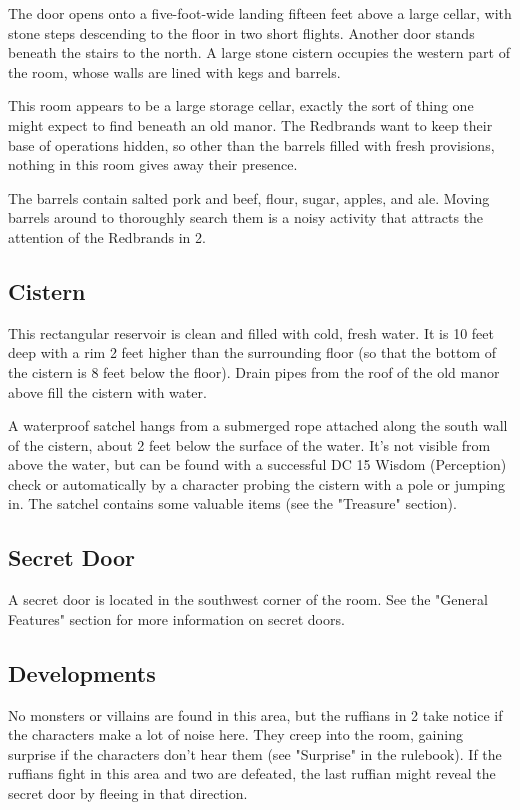 \documentclass[10pt,a4paper,twoside,bg=print,twocolumn,openany,nodeprecatedcode]{dndbook}
\begin{document}
\begin{DndReadAloud}{}
The door opens onto a five-foot-wide landing fifteen feet above a large cellar, with stone steps descending to the floor in two short flights. Another door stands beneath the stairs to the north. A large stone cistern occupies the western part of the room, whose walls are lined with kegs and barrels.

\end{DndReadAloud}

This room appears to be a large storage cellar, exactly the sort of thing one might expect to find beneath an old manor. The Redbrands want to keep their base of operations hidden, so other than the barrels filled with fresh provisions, nothing in this room gives away their presence.

The barrels contain salted pork and beef, flour, sugar, apples, and ale. Moving barrels around to thoroughly search them is a noisy activity that attracts the attention of the Redbrands in 2.

\subsection{Cistern}
This rectangular reservoir is clean and filled with cold, fresh water. It is 10 feet deep with a rim 2 feet higher than the surrounding floor (so that the bottom of the cistern is 8 feet below the floor). Drain pipes from the roof of the old manor above fill the cistern with water.

A waterproof satchel hangs from a submerged rope attached along the south wall of the cistern, about 2 feet below the surface of the water. It's not visible from above the water, but can be found with a successful DC 15 Wisdom (Perception) check or automatically by a character probing the cistern with a pole or jumping in. The satchel contains some valuable items (see the "Treasure" section).

\subsection{Secret Door}
A secret door is located in the southwest corner of the room. See the "General Features" section for more information on secret doors.

\subsection{Developments}
No monsters or villains are found in this area, but the ruffians in 2 take notice if the characters make a lot of noise here. They creep into the room, gaining surprise if the characters don't hear them (see "Surprise" in the rulebook). If the ruffians fight in this area and two are defeated, the last ruffian might reveal the secret door by fleeing in that direction.
\end{document}
